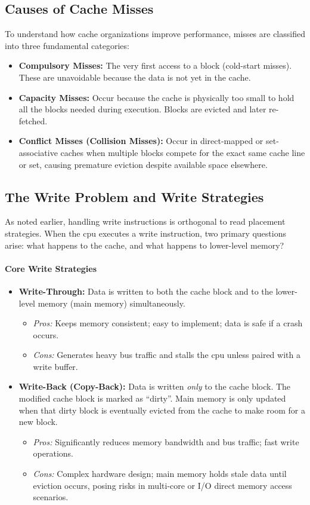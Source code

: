 \subsection{Causes of Cache Misses}
To understand how cache organizations improve performance, misses are classified into three fundamental categories:
\begin{itemize}
    \item \textbf{Compulsory Misses:} The very first access to a block (cold-start misses). These are unavoidable because the data is not yet in the cache.
    \item \textbf{Capacity Misses:} Occur because the cache is physically too small to hold all the blocks needed during execution. Blocks are evicted and later re-fetched.
    \item \textbf{Conflict Misses (Collision Misses):} Occur in direct-mapped or set-associative caches when multiple blocks compete for the exact same cache line or set, causing premature eviction despite available space elsewhere.
\end{itemize}

\subsection{The Write Problem and Write Strategies}
As noted earlier, handling write instructions is orthogonal to read placement strategies. When the \gls{cpu} executes a write instruction, two primary questions arise: what happens to the cache, and what happens to lower-level memory?

\paragraph{Core Write Strategies}
\begin{itemize}
    \item \textbf{Write-Through:} Data is written to both the cache block and to the lower-level memory (main memory) simultaneously. 
    \begin{itemize}
        \item \emph{Pros:} Keeps memory consistent; easy to implement; data is safe if a crash occurs.
        \item \emph{Cons:} Generates heavy bus traffic and stalls the \gls{cpu} unless paired with a write buffer.
    \end{itemize}
    \item \textbf{Write-Back (Copy-Back):} Data is written \emph{only} to the cache block. The modified cache block is marked as ``dirty''. Main memory is only updated when that dirty block is eventually evicted from the cache to make room for a new block.
    \begin{itemize}
        \item \emph{Pros:} Significantly reduces memory bandwidth and bus traffic; fast write operations.
        \item \emph{Cons:} Complex hardware design; main memory holds stale data until eviction occurs, posing risks in multi-core or I/O direct memory access scenarios.
    \end{itemize}
\end{itemize}

